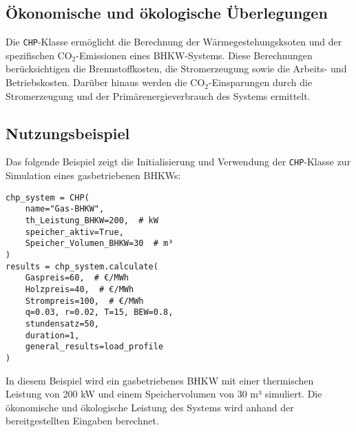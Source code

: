 \subsection{Ökonomische und ökologische Überlegungen}
Die \texttt{CHP}-Klasse ermöglicht die Berechnung der Wärmegestehungsksoten und der spezifischen CO$_2$-Emissionen eines BHKW-Systems. Diese Berechnungen berücksichtigen die Brennstoffkosten, die Stromerzeugung sowie die Arbeits- und Betriebskosten. Darüber hinaus werden die CO$_2$-Einsparungen durch die Stromerzeugung und der Primärenergieverbrauch des Systems ermittelt.

\subsection{Nutzungsbeispiel}
Das folgende Beispiel zeigt die Initialisierung und Verwendung der \texttt{CHP}-Klasse zur Simulation eines gasbetriebenen BHKWs:

\begin{verbatim}
chp_system = CHP(
    name="Gas-BHKW", 
    th_Leistung_BHKW=200,  # kW
    speicher_aktiv=True,
    Speicher_Volumen_BHKW=30  # m³
)
results = chp_system.calculate(
    Gaspreis=60,  # €/MWh
    Holzpreis=40,  # €/MWh
    Strompreis=100,  # €/MWh
    q=0.03, r=0.02, T=15, BEW=0.8, 
    stundensatz=50, 
    duration=1, 
    general_results=load_profile
)
\end{verbatim}
In diesem Beispiel wird ein gasbetriebenes BHKW mit einer thermischen Leistung von 200 kW und einem Speichervolumen von 30 m³ simuliert. Die ökonomische und ökologische Leistung des Systems wird anhand der bereitgestellten Eingaben berechnet.
